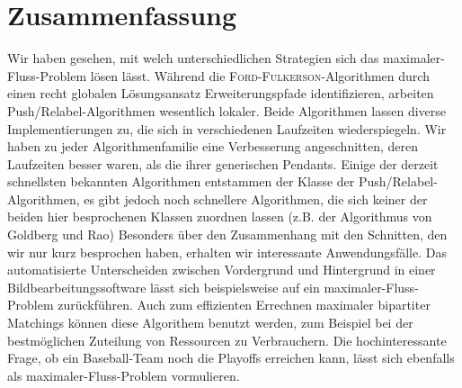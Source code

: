 \documentclass[12pt,a4paper,titlepage,onecolumn,ngerman,bibliography=totocnumbered]{scrartcl}
\theoremstyle{definition}
\theoremstyle{remark}
\newcommand{\ff}{\textsc{Ford-Fulkerson}}
\newcommand{\pr}{Push/Relabel}
\begin{document}
\section{Zusammenfassung}
Wir haben gesehen, mit welch unterschiedlichen Strategien sich das maximaler-Fluss-Problem lösen lässt.
Während die \ff -Algorithmen durch einen recht globalen Lösungsansatz Erweiterungspfade identifizieren, arbeiten \pr -Algorithmen wesentlich lokaler.
Beide Algorithmen lassen diverse Implementierungen zu, die sich in verschiedenen Laufzeiten wiederspiegeln.
Wir haben zu jeder Algorithmenfamilie eine Verbesserung angeschnitten, deren Laufzeiten besser waren, als die ihrer generischen Pendants.
Einige der derzeit schnellsten bekannten Algorithmen entstammen der Klasse der \pr -Algorithmen, es gibt jedoch noch schnellere Algorithmen, die sich keiner der beiden hier besprochenen Klassen zuordnen lassen (z.B. der Algorithmus von Goldberg und Rao)
\medbreak
Besonders über den Zusammenhang mit den Schnitten, den wir nur kurz besprochen haben, erhalten wir interessante Anwendungsfälle.
Das automatisierte Unterscheiden zwischen Vordergrund und Hintergrund in einer Bildbearbeitungssoftware lässt sich beispielsweise auf ein maximaler-Fluss-Problem zurückführen.
Auch zum effizienten Errechnen maximaler bipartiter Matchings können diese Algorithem benutzt werden, zum Beispiel bei der bestmöglichen Zuteilung von Ressourcen zu Verbrauchern.
Die hochinteressante Frage, ob ein Baseball-Team noch die Playoffs erreichen kann, lässt sich ebenfalls als maximaler-Fluss-Problem vormulieren. \parencite{baseball}
\newpage
\printbibliography
\end{document}
